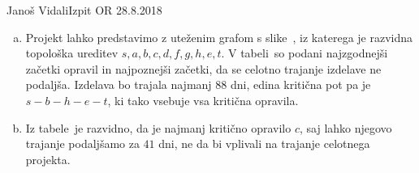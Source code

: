 \begin{naloga}{Janoš Vidali}{Izpit OR 28.8.2018}
\begin{odgovor}
\begin{enumerate}[(a)]
\item Projekt lahko predstavimo z uteženim grafom s slike~\fig,
iz katerega je raz\-vid\-na topološka ureditev $s, a, b, c, d, f, g, h, e, t$.
V tabeli~
so podani naj\-zgod\-nej\-ši začetki opravil in najpoznejši začetki,
da se celotno trajanje izdelave ne podaljša.
Izdelava bo trajala najmanj $88$ dni,
edina kritična pot pa je $s - b - h - e - t$,
ki tako vsebuje vsa kritična opravila.

\item Iz tabele~ je razvidno,
da je najmanj kritično opravilo $c$,
saj lahko njegovo trajanje podaljšamo za $41$ dni,
ne da bi vplivali na trajanje celotnega projekta.


\end{enumerate}
\end{odgovor}
\end{naloga}

